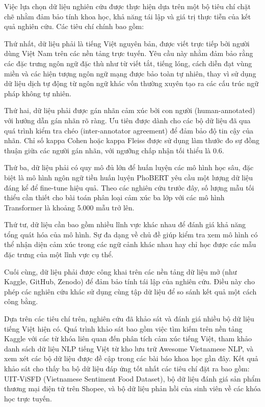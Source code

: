 \documentclass[14pt, a4paper]{report}
\begin{document}
Việc lựa chọn dữ liệu nghiên cứu được thực hiện dựa trên một bộ tiêu chí chặt chẽ nhằm đảm bảo tính khoa học, khả năng tái lập và giá trị thực tiễn của kết quả nghiên cứu. Các tiêu chí chính bao gồm:


Thứ nhất, dữ liệu phải là tiếng Việt nguyên bản, được viết trực tiếp bởi người dùng Việt Nam trên các nền tảng trực tuyến. Yêu cầu này nhằm đảm bảo rằng các đặc trưng ngôn ngữ đặc thù như từ viết tắt, tiếng lóng, cách diễn đạt vùng miền và các hiện tượng ngôn ngữ mạng được bảo toàn tự nhiên, thay vì sử dụng dữ liệu dịch tự động từ ngôn ngữ khác vốn thường xuyên tạo ra các cấu trúc ngữ pháp không tự nhiên.


Thứ hai, dữ liệu phải được gán nhãn cảm xúc bởi con người (human-annotated) với hướng dẫn gán nhãn rõ ràng. Ưu tiên được dành cho các bộ dữ liệu đã qua quá trình kiểm tra chéo (inter-annotator agreement) để đảm bảo độ tin cậy của nhãn. Chỉ số kappa Cohen hoặc kappa Fleiss được sử dụng làm thước đo sự đồng thuận giữa các người gán nhãn, với ngưỡng chấp nhận tối thiểu là 0.6.


Thứ ba, dữ liệu phải có quy mô đủ lớn để huấn luyện các mô hình học sâu, đặc biệt là mô hình ngôn ngữ tiền huấn luyện PhoBERT yêu cầu một lượng dữ liệu đáng kể để fine-tune hiệu quả. Theo các nghiên cứu trước đây, số lượng mẫu tối thiểu cần thiết cho bài toán phân loại cảm xúc ba lớp với các mô hình Transformer là khoảng 5.000 mẫu trở lên.


Thứ tư, dữ liệu cần bao gồm nhiều lĩnh vực khác nhau để đánh giá khả năng tổng quát hóa của mô hình. Sự đa dạng về chủ đề giúp kiểm tra xem mô hình có thể nhận diện cảm xúc trong các ngữ cảnh khác nhau hay chỉ học được các mẫu đặc trưng của một lĩnh vực cụ thể.


Cuối cùng, dữ liệu phải được công khai trên các nền tảng dữ liệu mở (như Kaggle, GitHub, Zenodo) để đảm bảo tính tái lập của nghiên cứu. Điều này cho phép các nghiên cứu khác sử dụng cùng tập dữ liệu để so sánh kết quả một cách công bằng.


Dựa trên các tiêu chí trên, nghiên cứu đã khảo sát và đánh giá nhiều bộ dữ liệu tiếng Việt hiện có. Quá trình khảo sát bao gồm việc tìm kiếm trên nền tảng Kaggle với các từ khóa liên quan đến phân tích cảm xúc tiếng Việt, tham khảo danh sách dữ liệu NLP tiếng Việt từ kho lưu trữ Awesome Vietnamese NLP, và xem xét các bộ dữ liệu được đề cập trong các bài báo khoa học gần đây. Kết quả khảo sát cho thấy ba bộ dữ liệu đáp ứng tốt nhất các tiêu chí đặt ra bao gồm: UIT-ViSFD (Vietnamese Sentiment Food Dataset), bộ dữ liệu đánh giá sản phẩm thương mại điện tử trên Shopee, và bộ dữ liệu phản hồi của sinh viên về các khóa học trực tuyến.
\end{document}
